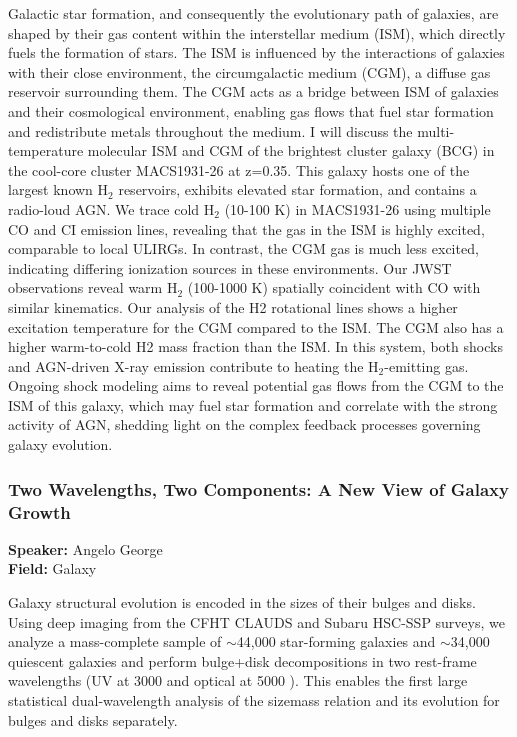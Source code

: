 Galactic star formation, and consequently the evolutionary path of galaxies, are shaped by their gas content within the interstellar medium (ISM), which directly fuels the formation of stars. The ISM is influenced by the interactions of galaxies with their close environment, the circumgalactic medium (CGM), a diffuse gas reservoir surrounding them. The CGM acts as a bridge between ISM of galaxies and their cosmological environment, enabling gas flows that fuel star formation and redistribute metals throughout the medium. I will discuss the multi-temperature molecular ISM and CGM of the brightest cluster galaxy (BCG) in the cool-core cluster MACS1931-26 at z=0.35. This galaxy hosts one of the largest known H$_{2}$ reservoirs, exhibits elevated star formation, and contains a radio-loud AGN. We trace cold H$_{2}$ (10-100 K) in MACS1931-26 using multiple CO and CI emission lines, revealing that the gas in the ISM is highly excited, comparable to local ULIRGs. In contrast, the CGM gas is much less excited, indicating differing ionization sources in these environments. Our JWST observations reveal warm H$_{2}$ (100-1000 K) spatially coincident with CO with similar kinematics. Our analysis of the H2 rotational lines shows a higher excitation temperature for the CGM compared to the ISM. The CGM also has a higher warm-to-cold H2 mass fraction than the ISM. In this system, both shocks and AGN-driven X-ray emission contribute to heating the H$_{2}$-emitting gas. Ongoing shock modeling aims to reveal potential gas flows from the CGM to the ISM of this galaxy, which may fuel star formation and correlate with the strong activity of AGN, shedding light on the complex feedback processes governing galaxy evolution.

\hypertarget{abstract-talk-51}{}\label{abstract-page-talk-51}
\subsubsection*{Two Wavelengths, Two Components: A New View of Galaxy Growth}
\textbf{Speaker:} Angelo George\\
\textbf{Field:} Galaxy

Galaxy structural evolution is encoded in the sizes of their bulges and disks. Using deep imaging from the CFHT CLAUDS and Subaru HSC-SSP surveys, we analyze a mass-complete sample of $\sim$44,000 star-forming galaxies and $\sim$34,000 quiescent galaxies and perform bulge+disk decompositions in two rest-frame wavelengths (UV at 3000 and optical at 5000 ). This enables the first large statistical dual-wavelength analysis of the sizemass relation and its evolution for bulges and disks separately.

